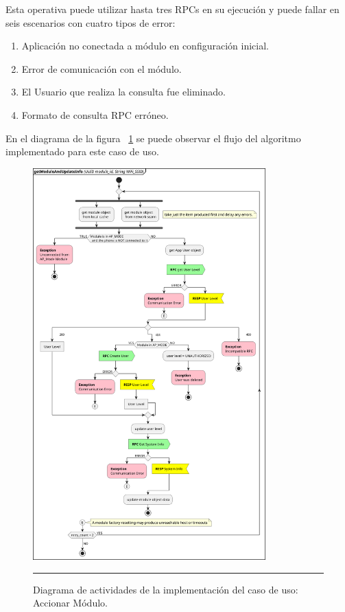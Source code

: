 Esta operativa puede utilizar hasta tres RPCs en su ejecución y puede fallar en seis escenarios con cuatro tipos de error:

\begin{enumerate}
	\item Aplicación no conectada a módulo en configuración inicial.
	\item Error de comunicación con el módulo.
	\item El Usuario que realiza la consulta fue eliminado.
	\item Formato de consulta RPC erróneo.
\end{enumerate}

En el diagrama de la figura ~\ref{fig:act_get_umod_data} se puede observar el flujo del algoritmo implementado para este caso de uso.

\begin{figure}[htbp]
	\centering
	\includegraphics[width=0.8\textwidth]{Figures/iter1/ACT_getModuleAndUpdateInfo_ink.png}
	\rule{35em}{1pt}
	\caption[Class Diagram]{Diagrama de actividades de la implementación del caso de uso: Accionar Módulo.}
	\label{fig:act_get_umod_data}
\end{figure}

